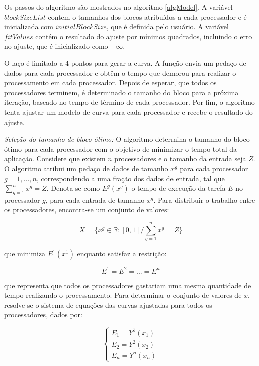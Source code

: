 Os passos do algoritmo são mostrados no algoritmo \ref{algModel}. A variável $blockSizeList$ contem o tamanhos dos blocos atribuídos a cada processador e é inicializada com $initialBlockSize$, que é definida pelo usuário. A variável $fitValues$ contém o resultado do ajuste por mínimos quadrados, incluindo o erro no ajuste, que é inicializado como $+\infty$. 

O laço é limitado a 4 pontos para gerar a curva. A função envia um pedaço de dados para cada processador e obtêm o tempo que demorou para realizar o processamento em cada processador. Depois de esperar, que todos os processadores terminem, é determinado o tamanho do bloco para a próxima iteração, baseado no tempo de término de cada processador. Por fim, o algoritmo tenta ajustar um modelo de curva para cada processador e recebe o resultado do ajuste.

\textit{Seleção do tamanho de bloco ótimo:} O algoritmo determina o tamanho do bloco ótimo para cada processador com o objetivo de minimizar o  tempo total da aplicação. Considere que existem $n$ processadores e o tamanho da entrada seja $Z$. O algoritmo atribui um pedaço de dados de tamanho $x^g$ para cada processador $g= 1,..., n$, correspondendo a uma fração dos dados de entrada, tal que $\sum_{g=1}^n x^g = Z$. Denota-se como $E^g(x^g)$ o tempo de execução da tarefa $E$ no processador $g$, para cada entrada de tamanho $x^g$. Para distribuir o trabalho entre os processadores, encontra-se um conjunto de valores:

\begin{equation}
	X = \{ x^g \in \mathbb{R}:[0,1] / \sum_{g=1}^n x^g = Z \}
	\label{eq: totalResultado}
\end{equation}

que minimiza $E^1(x^1)$ enquanto satisfaz a restrição:

\begin{equation}
	E^{1} = E^{2} = ...= E^{n}
	\label{eq: Restricao}
\end{equation}
 
que representa que todos os processadores gastariam uma mesma quantidade de tempo realizando o processamento. Para determinar o conjunto de valores de $x$, resolve-se o sistema de equações das curvas ajustadas para todos os processadores, dados por:

\begin{equation}
	\left\lbrace
	\begin{array}{ll}
		\displaystyle E_{1} = Y^1(x_{1})  \\
		\displaystyle E_{2} = Y^2(x_{2})   \\
		\displaystyle E_{n} = Y^n(x_{n}) 
		\label{eq: system}
	\end{array}
	\right.
\end{equation}

